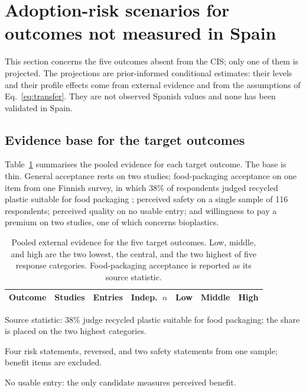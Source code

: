 \section{Adoption-risk scenarios for outcomes not measured in Spain}
\label{sec:scenarios}

This section concerns the five outcomes absent from the CIS; only one of them
is projected. The projections are prior-informed conditional estimates: their
levels and their profile
effects come from external evidence and from the assumptions of
Eq.~\eqref{eq:transfer}. They are not observed Spanish values and none has been
validated in Spain.

\subsection{Evidence base for the target outcomes}
\label{sec:evidence_base}

Table~\ref{tab:novel} summarises the pooled evidence for each target outcome.
The base is thin. General acceptance rests on two studies; food-packaging
acceptance on one item from one Finnish survey, in which 38\% of respondents
judged recycled plastic suitable for food packaging \citep{ruokamo2022};
perceived safety on a single sample of 116 respondents; perceived quality on
no usable entry;
and willingness to pay a premium on two studies, one of which concerns
bioplastics.

\begin{table}[htbp]
\centering
\caption{Pooled external evidence for the five target outcomes. Low, middle,
and high are the two lowest, the central, and the two highest of five response
categories. Food-packaging acceptance is reported as its source statistic.}
\label{tab:novel}
\small
\begin{threeparttable}
\begin{tabular}{lrrrccc}
\toprule
\textbf{Outcome} & \textbf{Studies} & \textbf{Entries} &
  \textbf{Indep.\ $n$} & \textbf{Low} & \textbf{Middle} & \textbf{High} \\
\midrule
\bottomrule
\end{tabular}
\begin{tablenotes}\small
\item[a] Source statistic: 38\% judge recycled plastic suitable for food
  packaging; the share is placed on the two highest categories.
\item[b] Four risk statements, reversed, and two safety statements from one
  sample; benefit items are excluded.
\item[c] No usable entry: the only candidate measures perceived benefit.
\end{tablenotes}
\end{threeparttable}
\end{table}

